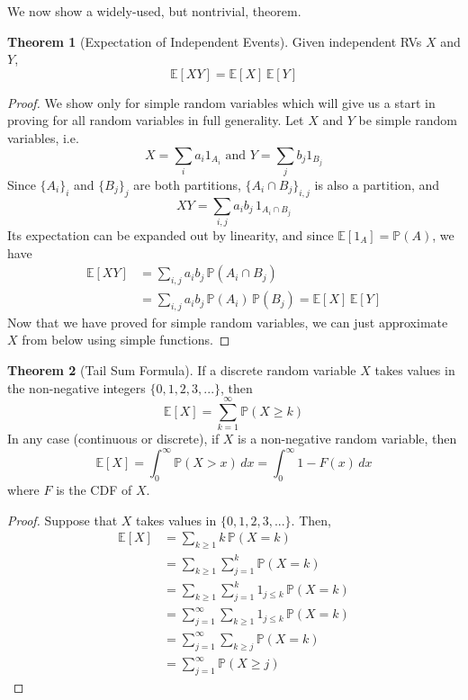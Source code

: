 \documentclass{article}
\theoremstyle{definition}
\newtheorem{theorem}{Theorem}[section]
\theoremstyle{remark}
\theoremstyle{definition}
\begin{document}
We now show a widely-used, but nontrivial, theorem. 

\begin{theorem}[Expectation of Independent Events]
Given independent RVs $X$ and $Y$, 
\[\mathbb{E}[X Y] = \mathbb{E}[X] \, \mathbb{E}[Y]\]
\end{theorem}
\begin{proof}
We show only for simple random variables which will give us a start in proving for all random variables in full generality. Let $X$ and $Y$ be simple random variables, i.e. 
\[X = \sum_i a_i 1_{A_i} \text{ and } Y = \sum_j b_j 1_{B_j}\]
Since $\{A_i\}_i$ and $\{B_j\}_j$ are both partitions, $\{A_i \cap B_j\}_{i, j}$ is also a partition, and 
\[X Y = \sum_{i, j} a_i b_j \, 1_{A_i \cap B_j}\]
Its expectation can be expanded out by linearity, and since $\mathbb{E}[ 1_{A} ] = \mathbb{P}(A)$, we have
\begin{align*}
    \mathbb{E}[X Y] & = \sum_{i, j} a_i b_j \, \mathbb{P}(A_i \cap B_j) \\
    & = \sum_{i, j} a_i b_j \, \mathbb{P}(A_i)\, \mathbb{P}(B_j) = \mathbb{E}[X] \, \mathbb{E}[Y]
\end{align*}
Now that we have proved for simple random variables, we can just approximate $X$ from below using simple functions. 
\end{proof}

\begin{theorem}[Tail Sum Formula]
If a discrete random variable $X$ takes values in the non-negative integers $\{0, 1, 2, 3, ...\}$, then 
\[\mathbb{E}[X] = \sum_{k=1}^\infty \mathbb{P}(X \geq k)\]
In any case (continuous or discrete), if $X$ is a non-negative random variable, then 
\[\mathbb{E}[X] = \int_0^\infty \mathbb{P}(X > x) \, dx = \int_0^\infty 1 - F(x) \, dx\]
where $F$ is the CDF of $X$. 
\end{theorem}
\begin{proof}
Suppose that $X$ takes values in $\{0, 1, 2, 3, ...\}$. Then, 
\begin{align*}
    \mathbb{E}[X] & = \sum_{k \geq 1} k \, \mathbb{P}(X=k) \\
    & = \sum_{k\geq 1} \sum_{j=1}^k \mathbb{P}(X = k) \\
    & = \sum_{k \geq 1} \sum_{j=1}^k 1_{j \leq k} \, \mathbb{P}(X=k) \\
    & = \sum_{j=1}^\infty \sum_{k \geq 1} 1_{j \leq k} \, \mathbb{P}(X =k) \\
    & = \sum_{j=1}^\infty \sum_{k \geq j} \mathbb{P}(X=k) \\
    & = \sum_{j=1}^\infty \mathbb{P}(X \geq j)
\end{align*}
\end{proof}
\end{document}
